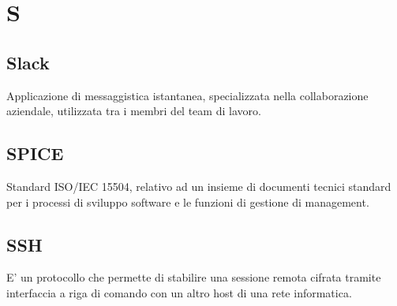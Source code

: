 \section*{S}

\subsection{Slack}
Applicazione di messaggistica istantanea, specializzata nella collaborazione aziendale, utilizzata tra i membri del team di lavoro.

\subsection{SPICE}
Standard ISO/IEC 15504, relativo ad un insieme di documenti tecnici standard per i processi di sviluppo software e le funzioni di gestione di management.

\subsection{SSH}
E' un protocollo che permette di stabilire una sessione remota cifrata tramite interfaccia a riga di comando con un altro host di una rete informatica.